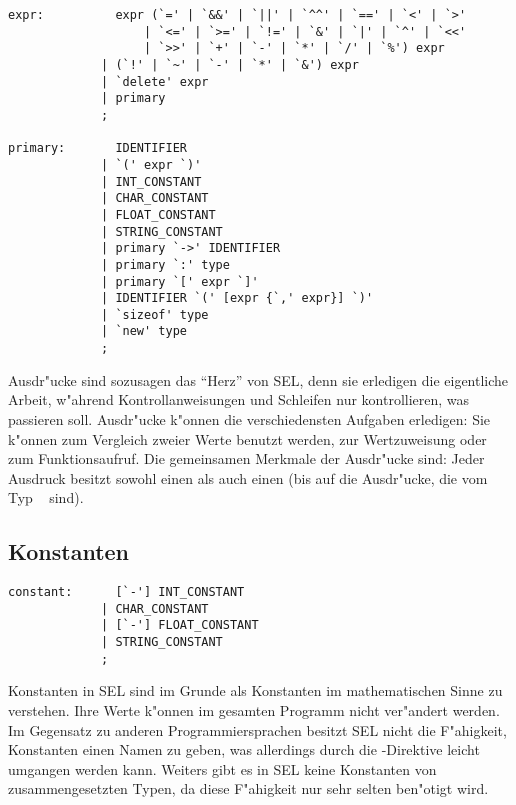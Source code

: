 \begin{verbatim}
expr:          expr (`=' | `&&' | `||' | `^^' | `==' | `<' | `>'
                   | `<=' | `>=' | `!=' | `&' | `|' | `^' | `<<'
                   | `>>' | `+' | `-' | `*' | `/' | `%') expr
             | (`!' | `~' | `-' | `*' | `&') expr
             | `delete' expr
             | primary
             ;

primary:       IDENTIFIER
             | `(' expr `)'
             | INT_CONSTANT
             | CHAR_CONSTANT
             | FLOAT_CONSTANT
             | STRING_CONSTANT
             | primary `->' IDENTIFIER
             | primary `:' type
             | primary `[' expr `]'
             | IDENTIFIER `(' [expr {`,' expr}] `)'
             | `sizeof' type
             | `new' type
             ;
\end{verbatim}

Ausdr"ucke sind sozusagen das "`Herz"' von SEL, denn sie
erledigen die eigentliche Arbeit, w"ahrend Kontrollanweisungen
und Schleifen nur kontrollieren, was passieren soll. Ausdr"ucke k"onnen die
verschiedensten Aufgaben erledigen: Sie k"onnen zum Vergleich
zweier Werte benutzt werden, zur Wertzuweisung oder zum
Funktionsaufruf. Die gemeinsamen Merkmale der Ausdr"ucke sind:
Jeder Ausdruck besitzt sowohl einen  als auch einen
 (bis auf die Ausdr"ucke, die vom Typ \tvoid\
sind).

\subsection{Konstanten}

\begin{verbatim}
constant:      [`-'] INT_CONSTANT
             | CHAR_CONSTANT
             | [`-'] FLOAT_CONSTANT
             | STRING_CONSTANT
             ;
\end{verbatim}

Konstanten in SEL sind im Grunde als Konstanten im
mathematischen Sinne zu verstehen. Ihre Werte k"onnen im gesamten
Programm nicht
ver"andert werden. Im Gegensatz zu anderen Programmiersprachen
besitzt SEL nicht die F"ahigkeit, Konstanten einen Namen zu geben,
\index{Konstante!benannte}
was allerdings durch die -Direktive leicht umgangen
werden kann. Weiters gibt es in SEL keine Konstanten von
zusammengesetzten Typen,
da diese F"ahigkeit nur sehr selten ben"otigt wird.

